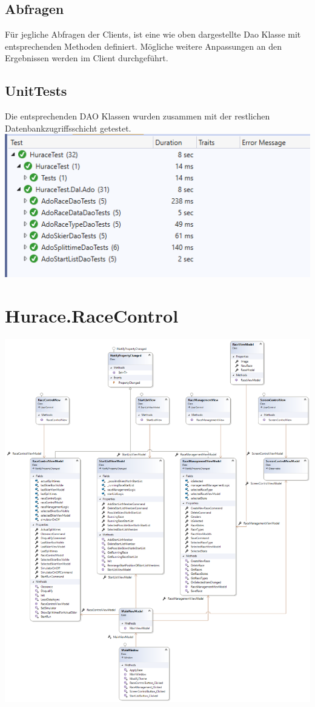 \documentclass[a4paper, 12pt]{article}
\begin{document}
	\subsection{Abfragen}
	Für jegliche Abfragen der Clients, ist eine wie oben dargestellte Dao Klasse mit entsprechenden Methoden definiert. Mögliche weitere Anpassungen an den Ergebnissen werden im Client durchgeführt.
	
	\subsection{UnitTests}
	Die entsprechenden DAO Klassen wurden zusammen mit der restlichen Datenbankzugriffsschicht getestet. 
	\newline
	\newline
	\includegraphics[width=.7\textwidth]{img/UnitTests.png}
	
	\section{Hurace.RaceControl}
	\includegraphics[width=.9\textwidth]{img/RaceControl.png}
\end{document}
